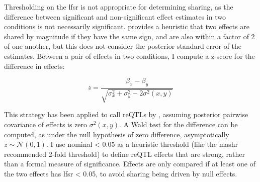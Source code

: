 Thresholding on the lfsr is not appropriate for determining sharing, as the difference between significant and non-significant effect estimates in two conditions is not necessarily significant\autocite{schenker2001JudgingSignificanceDifferences,gelman2006DifferenceSignificantNot}.
\autocite{urbut2018FlexibleStatisticalMethods} provides a heuristic that two effects are shared by magnitude if they have the same sign, and are also within a factor of 2 of one another,
but this does not consider the posterior standard error of the estimates.
Between a pair of effects in two conditions, I compute a z-score for the difference in effects\autocite{clogg1995StatisticalMethodsComparing,schenker2001JudgingSignificanceDifferences}:

\begin{equation}
z = \frac{\beta_x - \beta_y}{\sqrt{\sigma_x^2 + \sigma_y^2 - 2\sigma^2(x, y)}}
\end{equation}

This strategy has been applied to call reQTLs by \autocite{kim-hellmuth2017GeneticRegulatoryEffects},
assuming posterior pairwise covariance of effects is zero $\sigma^2(x, y)$.
A Wald test \pvalue{} for the difference can be computed, as under the null hypothesis of zero difference, asymptotically $z \sim \mathcal{N}(0, 1)$.
I use nominal \pvalue{} < 0.05 as a heuristic threshold (like the mashr recommended 2-fold threshold) to define reQTL effects that are strong, rather than a formal measure of significance.
Effects are only compared if at least one of the two effects has lfsr < 0.05, to avoid sharing being driven by null effects.

